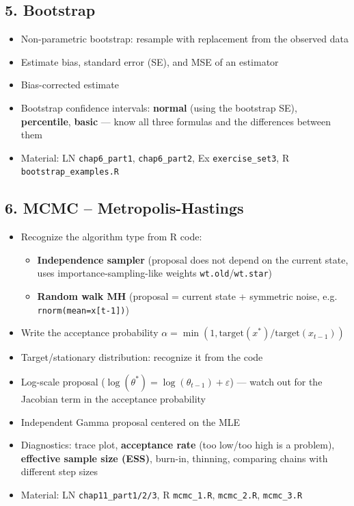 \documentclass[11pt]{article}
\begin{document}
\subsection*{5. Bootstrap}
\begin{itemize}[leftmargin=*]
  \item Non-parametric bootstrap: resample with replacement from the observed data
  \item Estimate bias, standard error (SE), and MSE of an estimator
  \item Bias-corrected estimate
  \item Bootstrap confidence intervals: \textbf{normal} (using the bootstrap SE),
  \textbf{percentile}, \textbf{basic} --- know all three formulas and the differences between them
  \item Material: LN \texttt{chap6\_part1}, \texttt{chap6\_part2}, Ex \texttt{exercise\_set3}, R
  \texttt{bootstrap\_examples.R}
\end{itemize}

\subsection*{6. MCMC -- Metropolis-Hastings}
\begin{itemize}[leftmargin=*]
  \item Recognize the algorithm type from R code:
  \begin{itemize}
    \item \textbf{Independence sampler} (proposal does not depend on the current state,
    uses importance-sampling-like weights \texttt{wt.old}/\texttt{wt.star})
    \item \textbf{Random walk MH} (proposal = current state + symmetric noise, e.g.
    \texttt{rnorm(mean=x[t-1])})
  \end{itemize}
  \item Write the acceptance probability $\alpha = \min(1, \text{target}(x^*)/\text{target}(x_{t-1}))$
  \item Target/stationary distribution: recognize it from the code
  \item Log-scale proposal ($\log(\theta^*) = \log(\theta_{t-1}) + \varepsilon$) --- watch out for
  the Jacobian term in the acceptance probability
  \item Independent Gamma proposal centered on the MLE
  \item Diagnostics: trace plot, \textbf{acceptance rate} (too low/too high is a problem),
  \textbf{effective sample size (ESS)}, burn-in, thinning, comparing chains with different
  step sizes
  \item Material: LN \texttt{chap11\_part1/2/3}, R \texttt{mcmc\_1.R}, \texttt{mcmc\_2.R},
  \texttt{mcmc\_3.R}
\end{itemize}
\end{document}
